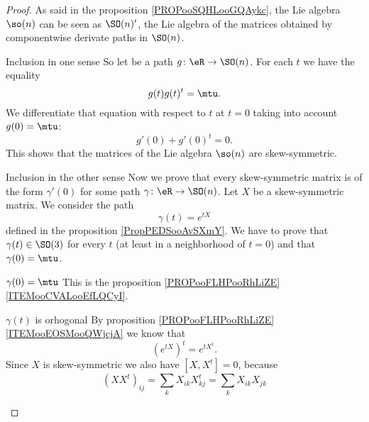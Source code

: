\begin{proof}
    As said in the proposition \ref{PROPooSQHLooGQAykc}, the Lie algebra \( \so(n)\) can be seen as \( \SO(n)'\), the Lie algebra of the matrices obtained by componentwise derivate paths in \( \SO(n)\). 
    
    \begin{subproof}
        \item[Inclusion in one sense]
            So let be a path \( g\colon \eR\to \SO(n)\). For each \( t\) we have the equality
            \begin{equation}
                g(t)g(t)^t=\mtu.
            \end{equation}
            We differentiate that equation with respect to \( t\) at \( t=0\) taking into account \( g(0)=\mtu\):
            \begin{equation}
                g'(0)+g'(0)^t=0.
            \end{equation}
            This shows that the matrices of the Lie algebra \( \so(n)\) are skew-symmetric.
        \item[Inclusion in the other sense]
            Now we prove that every skew-symmetric matrix is of the form \( \gamma'(0)\) for some path \( \gamma\colon \eR\to \SO(n) \). Let \( X\) be a skew-symmetric matrix. We consider the path
            \begin{equation}
                \gamma(t)= e^{tX}
            \end{equation}
            defined in the proposition \ref{PropPEDSooAvSXmY}. We have to prove that \( \gamma(t)\in \SO(3)\) for every \( t\) (at least in a neighborhood of \( t=0\)) and that \( \gamma(0)=\mtu\).
            \begin{subproof}
                \item[\( \gamma(0)=\mtu\)]
                    This is the proposition \ref{PROPooFLHPooRhLiZE}\ref{ITEMooCVALooEfLQCyI}.
                \item[\( \gamma(t)\) is orhogonal]
                    By proposition \ref{PROPooFLHPooRhLiZE}\ref{ITEMooEOSMooQWjcjA} we know that 
                    \begin{equation}
                        ( e^{tX})^t= e^{tX^t}.
                    \end{equation}
                    Since \( X\) is skew-symmetric we also have \( [X,X^t]=0\), because
                    \begin{equation}
                        (XX^t)_{ij}=\sum_kX_{ik}X^t_{kj}=\sum_kX_{ik}X_{jk}

\end{equation}
\end{subproof}
\end{subproof}
\end{proof}
